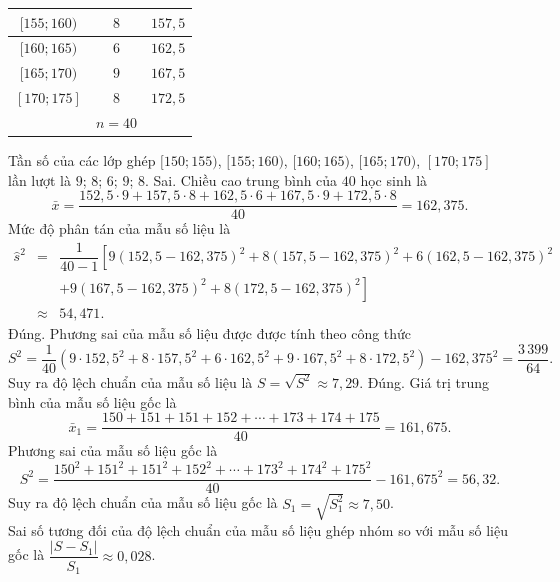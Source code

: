 \begin{ex}
{\begin{itemchoice}
\begin{center}
\begin{tabular}{|c|c|c|}
					\hline 
					$[155; 160)$ & $8$ & $157{,}5$ \\ 
					\hline 
					$[160; 165)$ & $6$ & $162{,}5$ \\ 
					\hline 
					$[165; 170)$ & $9$ & $167{,}5$ \\ 
					\hline 
					$[170; 175]$ & $8$ & $172{,}5$ \\ 
					\hline 
					& $n=40$ &  \\ 
					\hline 
				\end{tabular} 
			\end{center}
		Tần số của các lớp ghép $[150;155)$, $[155;160)$, $[160;165)$, $[165;170)$, $[170;175]$ lần lượt là $9$; $8$; $6$; $9$; $8$.
			\itemch Sai. Chiều cao trung bình của $40$ học sinh là$$\bar{x}=\dfrac{152{,}5\cdot9+157{,}5\cdot8+162{,}5\cdot6+167{,}5\cdot9+172{,}5\cdot8}{40}=162{,}375.$$
			Mức độ phân tán của mẫu số liệu là 
			\begin{eqnarray*}
				\widehat{s}^2&=&\dfrac{1}{40-1}\left[9(152{,}5-162{,}375)^2+8(157{,}5-162{,}375)^2+6(162{,}5-162{,}375)^2\right.\\&&\left.+9(167{,}5-162{,}375)^2+8(172{,}5-162{,}375)^2\right]\\
				&\approx&54{,}471.
			\end{eqnarray*}
			\itemch Đúng. Phương sai của mẫu số liệu được được tính theo công thức
			$$S^2=\dfrac{1}{40}\left(9\cdot152{,}5^2+8\cdot157{,}5^2+6\cdot162{,}5^2+9\cdot167{,}5^2+8\cdot172{,}5^2\right)-162{,}375^2=\dfrac{3\,399}{64}.$$
			Suy ra độ lệch chuẩn của mẫu số liệu là $S=\sqrt{S^2}\approx 7{,}29$.
			\itemch Đúng. Giá trị trung bình của mẫu số liệu gốc là$$\bar{x}_1=\dfrac{150+151+151+152+\cdots+173+174+175}{40}=161{,}675.$$
			Phương sai của mẫu số liệu gốc là$$S^2=\dfrac{150^2+151^2+151^2+152^2+\cdots+173^2+174^2+175^2}{40}-161{,}675^2=56{,}32.$$
			Suy ra độ lệch chuẩn của mẫu số liệu gốc là $S_1=\sqrt{S_1^2}\approx 7{,}50$.\\
			Sai số tương đối của độ lệch chuẩn của mẫu số liệu ghép nhóm so với mẫu số liệu gốc là $\dfrac{|S-S_1|}{S_1}\approx0{,}028$.
		\end{itemchoice}
	}
\end{ex}

